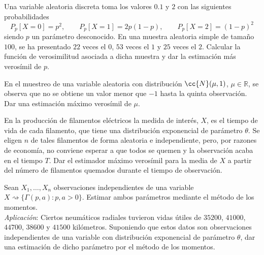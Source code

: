 \begin{ejercicio}
    Una variable aleatoria discreta toma los valores $0.1$ y $2$ con las siguientes probabilidades
    \begin{equation*}
        P_p[X=0] = p^2, \qquad P_p[X=1] = 2p(1-p), \qquad P_p[X=2] = {(1-p)}^{2}
    \end{equation*}
    siendo $p$ un parámetro desconocido. En una muestra aleatoria simple de tamaño $100$, se ha presentado $22$ veces el $0$, $53$ veces el $1$ y $25$ veces el $2$. Calcular la función de verosimilitud asociada a dicha muestra y dar la estimación más verosímil de $p$.
\end{ejercicio}

\begin{ejercicio}
    En el muestreo de una variable aleatoria con distribución $\cc{N}(\mu,1)$, $\mu \in \mathbb{R}$, se observa que no se obtiene un valor menor que $-1$ hasta la quinta observación. Dar una estimación máximo verosímil de $\mu$.
\end{ejercicio}

\begin{ejercicio}
    En la producción de filamentos eléctricos la medida de interés, $X$, es el tiempo de vida de cada filamento, que tiene una distribución exponencial de parámetro $\theta$. Se eligen $n$ de tales filamentos de forma aleatoria e independiente, pero, por razones de economía, no conviene esperar a que todos se quemen y la observación acaba en el tiempo $T$. Dar el estimador máximo verosímil para la media de $X$ a partir del número de filamentos quemados durante el tiempo de observación.
\end{ejercicio}

\begin{ejercicio}
    Sean $X_1, \ldots, X_n$ observaciones independientes de una variable $X\rightsquigarrow\{\Gamma(p,a) : p,a>0\}$. Estimar ambos parámetros mediante el método de los momentos.\\

    \noindent
    \textit{Aplicación}: Ciertos neumáticos radiales tuvieron vidas útiles de $35200$, $41000$, $44700$, $38600$ y $41500$ kilómetros. Suponiendo que estos datos son observaciones independientes de una variable con distribución exponencial de parámetro $\theta$, dar una estimación de dicho parámetro por el método de los momentos.
\end{ejercicio}
